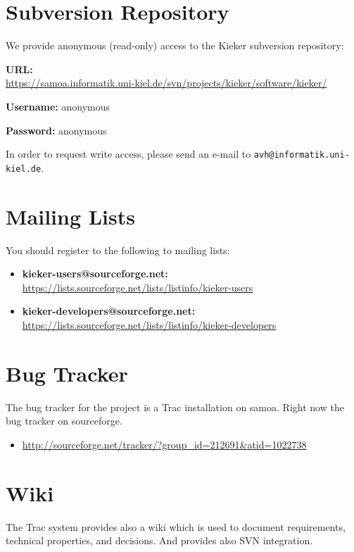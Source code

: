 \section{Subversion Repository}

We provide anonymous (read-only) access to the Kieker subversion repository:

\begin{compactitem}
\item \textbf{URL:}\\ \url{https://samoa.informatik.uni-kiel.de/svn/projects/kieker/software/kieker/}
\item \textbf{Username:} anonymous
\item \textbf{Password:} anonymous
\end{compactitem}

\medskip

\noindent In order to request write access, please send an e-mail to \texttt{avh@informatik.uni-kiel.de}.

\section{Mailing Lists}

You should register to the following to mailing lists:

\begin{itemize}
\item \textbf{kieker-users@sourceforge.net:}\\ \url{https://lists.sourceforge.net/lists/listinfo/kieker-users}
\item \textbf{kieker-developers@sourceforge.net:}\\ \url{https://lists.sourceforge.net/lists/listinfo/kieker-developers}
\end{itemize}


\section{Bug Tracker}

The bug tracker for the project is a Trac installation on samoa. Right now the bug tracker on sourceforge.

\begin{itemize}
\item[] \url{http://sourceforge.net/tracker/?group_id=212691&atid=1022738}
\end{itemize}

\section{Wiki}

The Trac system provides also a wiki which is used to document requirements, technical properties, and decisions. And provides also SVN integration.



